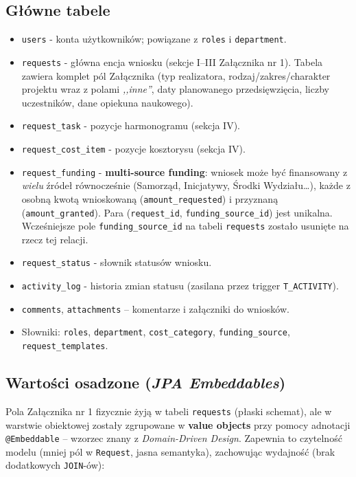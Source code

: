 \documentclass[12pt,a4paper]{article}
\begin{document}
\subsection{Główne tabele}
\begin{itemize}[leftmargin=*]
  \item \texttt{users} - konta użytkowników; powiązane z \texttt{roles} i \texttt{department}.
  \item \texttt{requests} - główna encja wniosku (sekcje I--III Załącznika nr 1).
        Tabela zawiera komplet pól Załącznika (typ realizatora, rodzaj/zakres/charakter
        projektu wraz z polami \emph{,,inne''}, daty planowanego przedsięwzięcia,
        liczby uczestników, dane opiekuna naukowego).
  \item \texttt{request\_task} - pozycje harmonogramu (sekcja IV).
  \item \texttt{request\_cost\_item} - pozycje kosztorysu (sekcja IV).
  \item \texttt{request\_funding} - \textbf{multi-source funding}: wniosek może
        być finansowany z \emph{wielu} źródeł równocześnie (Samorząd, Inicjatywy,
        Środki Wydziału\ldots), każde z osobną kwotą wnioskowaną
        (\texttt{amount\_requested}) i przyznaną (\texttt{amount\_granted}).
        Para (\texttt{request\_id}, \texttt{funding\_source\_id}) jest unikalna.
        Wcześniejsze pole \texttt{funding\_source\_id} na tabeli \texttt{requests}
        zostało usunięte na rzecz tej relacji.
  \item \texttt{request\_status} - słownik statusów wniosku.
  \item \texttt{activity\_log} - historia zmian statusu (zasilana przez trigger \texttt{T\_ACTIVITY}).
  \item \texttt{comments}, \texttt{attachments} -- komentarze i załączniki do wniosków.
  \item Słowniki: \texttt{roles}, \texttt{department}, \texttt{cost\_category},
        \texttt{funding\_source}, \texttt{request\_templates}.
\end{itemize}

\subsection{Wartości osadzone (\emph{JPA Embeddables})}
Pola Załącznika nr 1 fizycznie żyją w tabeli \texttt{requests} (płaski schemat),
ale w warstwie obiektowej zostały zgrupowane w \textbf{value objects} przy
pomocy adnotacji \texttt{@Embeddable} -- wzorzec znany z \emph{Domain-Driven
Design}. Zapewnia to czytelność modelu (mniej pól w \texttt{Request}, jasna
semantyka), zachowując wydajność (brak dodatkowych \texttt{JOIN}-ów):
\end{document}
